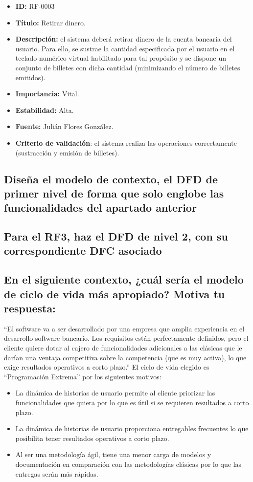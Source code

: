 \begin{itemize}
\item \textbf{ID:} RF-0003
\item \textbf{Título:} Retirar dinero.
\item \textbf{Descripción:} el sistema deberá retirar dinero de la cuenta bancaria del usuario. Para ello, se sustrae la cantidad especificada por el usuario en el teclado numérico virtual habilitado para tal propósito y se dispone un conjunto de billetes con dicha cantidad (minimizando el número de billetes emitidos).
\item \textbf{Importancia:} Vital.
\item \textbf{Estabilidad:} Alta.
\item \textbf{Fuente:} Julián Flores González.
\item \textbf{Criterio de validación}: el sistema realiza las operaciones correctamente (sustracción y emisión de billetes).
\end{itemize}

\subsection{Diseña el modelo de contexto, el DFD de primer nivel de forma que solo englobe las funcionalidades del apartado anterior}

\subsection{Para el RF3, haz el DFD de nivel 2, con su correspondiente DFC asociado}

\subsection{En el siguiente contexto, ¿cuál sería el modelo de ciclo de vida más apropiado? Motiva tu respuesta:}
``El software va a ser desarrollado por una empresa que amplia experiencia en el desarrollo software bancario. Los requisitos están perfectamente definidos, pero el cliente quiere dotar al cajero de funcionalidades adicionales a las clásicas que le darían una ventaja competitiva sobre la competencia (que es muy activa), lo que exige resultados operativos a corto plazo.''
El ciclo de vida elegido es ``Programación Extrema'' por los siguientes motivos:
\begin{itemize}
    \item La dinámica de historias de usuario permite al cliente priorizar las funcionalidades que quiera por lo que es útil si se requieren resultados a corto plazo.
    \item La dinámica de historias de usuario proporciona entregables frecuentes lo que posibilita tener resultados operativos a corto plazo.
    \item Al ser una metodología ágil, tiene una menor carga de modelos y documentación en comparación con las metodologías clásicas por lo que las entregas serán más rápidas.
\end{itemize}

